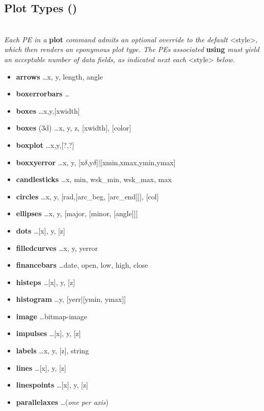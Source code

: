 \subsection*{Plot Types ()}
\\
\textit{Each PE in a }\textbf{plot}\textit{ command admits an optional override to the default }<style>\textit{, which then renders an eponymous plot type. The PE\textquotesingle s associated }\textbf{using}\textit{ must yield an acceptable number of data fields, as indicated next each }<style>\textit{ below.}

{\footnotesize
\begin{itemize}
    \item \textbf{arrows} \dots x, y, length, angle
    \item \textbf{boxerrorbars} \dots 
    \item \textbf{boxes} \dots x,y,[xwidth]
    \item \textbf{boxes} (3d) \dots x, y, z, [xwidth], [color]
    \item \textbf{boxplot} \dots x,y,[?,?]
    \item \textbf{boxxyerror} \dots x, y, [x$\delta$,y$\delta$]|[xmin,xmax,ymin,ymax]
    \item \textbf{candlesticks} \dots x, min, wsk\_min, wsk\_max, max
    \item \textbf{circles} \dots x, y, [rad,[arc\_beg, [arc\_end]]], [col]
    \item \textbf{ellipses} \dots x, y, [major, [minor, [angle]]]
    \item \textbf{dots} \dots [x], y, [z]
    \item \textbf{filledcurves} \dots x, y, yerror
    \item \textbf{financebars} \dots date, open, low, high, close
    \item \textbf{histeps} \dots [x], y, [z]
    \item \textbf{histogram} \dots y, [yerr|[ymin, ymax]] 
    \item \textbf{image} \dots bitmap-image 
    \item \textbf{impulses} \dots [x], y, [z] 
    \item \textbf{labels} \dots x, y, [z], string 
    \item \textbf{lines} \dots [x], y, [z]
    \item \textbf{linespoints} \dots [x], y, [z]
    \item \textbf{parallelaxes} \dots (\textit{one per axis}) 

\end{itemize}}
